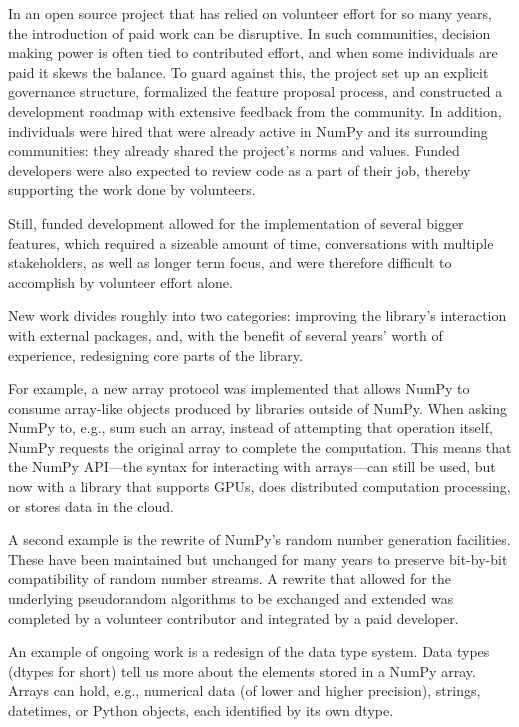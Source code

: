 In an open source project that has relied on volunteer effort for so many years, the introduction of paid work can be disruptive. In such communities, decision making power is often tied to contributed effort, and when some individuals are paid it skews the balance. To guard against this, the project set up an explicit governance structure, formalized the feature proposal process, and constructed a development roadmap with extensive feedback from the community.   In addition, individuals were hired that were already active in NumPy and its surrounding communities: they already shared the project's norms and values.  Funded developers were also expected to review code as a part of their job, thereby supporting the work done by volunteers.

Still, funded development allowed for the implementation of several bigger features, which required a sizeable amount of time, conversations with multiple stakeholders, as well as longer term focus, and were therefore difficult to accomplish by volunteer effort alone.

New work divides roughly into two categories: improving the library's interaction with external packages, and, with the benefit of several years' worth of experience, redesigning core parts of the library.

For example, a new array protocol was implemented that allows NumPy to consume array-like objects produced by libraries outside of NumPy.  When asking NumPy to, e.g., sum such an array, instead of attempting that operation itself, NumPy requests the original array to complete the computation.  This means that the NumPy API---the syntax for interacting with arrays---can still be used, but now with a library that supports GPUs, does distributed computation processing, or stores data in the cloud.

A second example is the rewrite of NumPy's random number generation facilities.  These have been maintained but unchanged for many years to preserve bit-by-bit compatibility of random number streams.  A rewrite that allowed for the underlying pseudorandom algorithms to be exchanged and extended was completed by a volunteer contributor and integrated by a paid developer.

An example of ongoing work is a redesign of the data type system.  Data types (dtypes for short) tell us more about the elements stored in a NumPy array. Arrays can hold, e.g., numerical data (of lower and higher precision), strings, datetimes, or Python objects, each identified by its own dtype.

